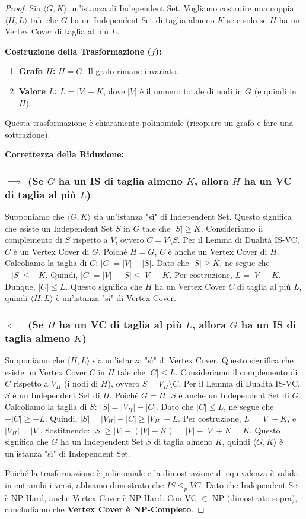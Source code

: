 \documentclass[a4paper]{article}
\theoremstyle{definition} %
\theoremstyle{definition} %
\begin{document}
\begin{proof}
Sia $\langle G, K \rangle$ un'istanza di Independent Set. Vogliamo costruire una coppia $\langle H, L \rangle$ tale che $G$ ha un Independent Set di taglia almeno $K$ se e solo se $H$ ha un Vertex Cover di taglia al più $L$.

\textbf{Costruzione della Trasformazione ($f$):}
\begin{enumerate}
    \item \textbf{Grafo $H$:} $H = G$. Il grafo rimane invariato.
    \item \textbf{Valore $L$:} $L = |V| - K$, dove $|V|$ è il numero totale di nodi in $G$ (e quindi in $H$).
\end{enumerate}
Questa trasformazione è chiaramente polinomiale (ricopiare un grafo e fare una sottrazione).

\textbf{Correttezza della Riduzione:}

\subsubsection{$\implies$ (Se $G$ ha un IS di taglia almeno $K$, allora $H$ ha un VC di taglia al più $L$)}
Supponiamo che $\langle G, K \rangle$ sia un'istanza "sì" di Independent Set. Questo significa che esiste un Independent Set $S$ in $G$ tale che $|S| \ge K$.
Consideriamo il complemento di $S$ rispetto a $V$, ovvero $C = V \setminus S$.
Per il Lemma di Dualità IS-VC, $C$ è un Vertex Cover di $G$. Poiché $H=G$, $C$ è anche un Vertex Cover di $H$.
Calcoliamo la taglia di $C$: $|C| = |V| - |S|$.
Dato che $|S| \ge K$, ne segue che $-|S| \le -K$.
Quindi, $|C| = |V| - |S| \le |V| - K$.
Per costruzione, $L = |V| - K$. Dunque, $|C| \le L$.
Questo significa che $H$ ha un Vertex Cover $C$ di taglia al più $L$, quindi $\langle H, L \rangle$ è un'istanza "sì" di Vertex Cover.

\subsubsection{$\impliedby$ (Se $H$ ha un VC di taglia al più $L$, allora $G$ ha un IS di taglia almeno $K$)}
Supponiamo che $\langle H, L \rangle$ sia un'istanza "sì" di Vertex Cover. Questo significa che esiste un Vertex Cover $C$ in $H$ tale che $|C| \le L$.
Consideriamo il complemento di $C$ rispetto a $V_H$ (i nodi di $H$), ovvero $S = V_H \setminus C$.
Per il Lemma di Dualità IS-VC, $S$ è un Independent Set di $H$. Poiché $G=H$, $S$ è anche un Independent Set di $G$.
Calcoliamo la taglia di $S$: $|S| = |V_H| - |C|$.
Dato che $|C| \le L$, ne segue che $-|C| \ge -L$.
Quindi, $|S| = |V_H| - |C| \ge |V_H| - L$.
Per costruzione, $L = |V| - K$, e $|V_H| = |V|$. Sostituendo:
$|S| \ge |V| - (|V| - K) = |V| - |V| + K = K$.
Questo significa che $G$ ha un Independent Set $S$ di taglia almeno $K$, quindi $\langle G, K \rangle$ è un'istanza "sì" di Independent Set.

Poiché la trasformazione è polinomiale e la dimostrazione di equivalenza è valida in entrambi i versi, abbiamo dimostrato che $IS \le_p VC$. Dato che Independent Set è NP-Hard, anche Vertex Cover è NP-Hard. Con VC $\in$ NP (dimostrato sopra), concludiamo che \textbf{Vertex Cover è NP-Completo}.
\end{proof}
\end{document}

